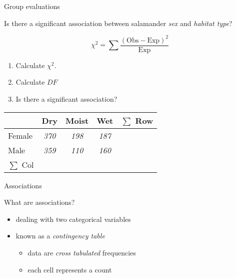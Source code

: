 \documentclass[
  ignorenonframetext,
  t]{beamer}
\providecommand{\tightlist}{%
  \setlength{\itemsep}{0pt}\setlength{\parskip}{0pt}}
\begin{document}
\begin{frame}{Group evaluations}
\protect\hypertarget{group-evaluations-1}{}

Is there a significant association between salamander \emph{sex} and
\emph{habitat type}?

\[\chi^2 = \sum \frac{(\text{Obs} - \text{Exp})^2}{\text{Exp}}\]

\begin{enumerate}
\tightlist
\item
  Calculate \(\chi^2\).\\
\item
  Calculate \(DF\)\\
\item
  Is there a significant association?
\end{enumerate}

\vspace{1cm}

\begin{tabular}{lcccc}
\hline     
           & Dry & Moist & Wet & $\sum$ Row \\ 
\hline
Female     & \emph{370} & \emph{198} & \emph{187} &      \\   
Male       & \emph{359} & \emph{110} & \emph{160} &      \\ 
$\sum$ Col &       &         &       &      \\ 
\hline
\end{tabular}


\end{frame}

\begin{frame}{Associations}
\protect\hypertarget{associations}{}

What are associations?

\begin{itemize}
\tightlist
\item
  dealing with two categorical variables
\item
  known as a \emph{contingency table}

  \begin{itemize}
  \tightlist
  \item
    data are \emph{cross tabulated} frequencies
  \item
    each cell represents a count
  \end{itemize}
\end{itemize}

\end{frame}
\end{document}
